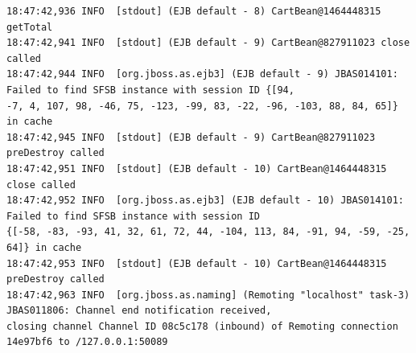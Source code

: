 \documentclass[a4paper,10pt]{scrreprt}
\begin{document}
\begin{enumerate}
\begin{lstlisting}[language={}]
18:47:42,936 INFO  [stdout] (EJB default - 8) CartBean@1464448315 getTotal
18:47:42,941 INFO  [stdout] (EJB default - 9) CartBean@827911023 close called
18:47:42,944 INFO  [org.jboss.as.ejb3] (EJB default - 9) JBAS014101: Failed to find SFSB instance with session ID {[94, 
-7, 4, 107, 98, -46, 75, -123, -99, 83, -22, -96, -103, 88, 84, 65]} in cache
18:47:42,945 INFO  [stdout] (EJB default - 9) CartBean@827911023 preDestroy called
18:47:42,951 INFO  [stdout] (EJB default - 10) CartBean@1464448315 close called
18:47:42,952 INFO  [org.jboss.as.ejb3] (EJB default - 10) JBAS014101: Failed to find SFSB instance with session ID 
{[-58, -83, -93, 41, 32, 61, 72, 44, -104, 113, 84, -91, 94, -59, -25, 64]} in cache
18:47:42,953 INFO  [stdout] (EJB default - 10) CartBean@1464448315 preDestroy called
18:47:42,963 INFO  [org.jboss.as.naming] (Remoting "localhost" task-3) JBAS011806: Channel end notification received, 
closing channel Channel ID 08c5c178 (inbound) of Remoting connection 14e97bf6 to /127.0.0.1:50089


\end{lstlisting}
\end{enumerate}
\end{document}
